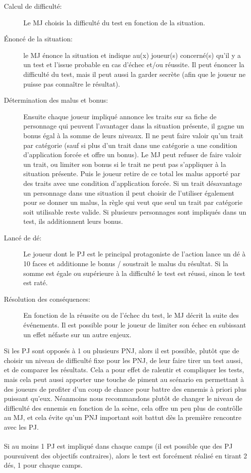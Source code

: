 \documentclass[a4paper,10pt,twoside,twocolumn]{article}
\begin{document}
 \begin{description}
  \item[Calcul de difficulté:] Le MJ choisis la difficulté du test en fonction de la situation.
  \item[Énoncé de la situation:] le MJ énonce la situation et indique au(x) joueur(s) concerné(s) qu'il y a un test et l'issue probable en cas d'échec et/ou réussite. Il peut énoncer la difficulté du test, mais il peut aussi la garder secrète (afin que le joueur ne puisse pas connaître le résultat).
  \item[Détermination des malus et bonus:] Ensuite chaque joueur impliqué annonce les traits sur sa fiche de personnage qui peuvent l'avantager dans la situation présente, il gagne un bonus égal à la somme de leurs niveaux. Il ne peut faire valoir qu'un trait par catégorie (sauf si plus d'un trait dans une catégorie a une condition d'application forcée et offre un bonus). Le MJ peut refuser de faire valoir un trait, ou limiter son bonus si le trait ne peut pas s'appliquer à la situation présente. Puis le joueur retire de ce total les malus apporté par des traits avec une condition d'application forcée. Si un trait désavantage un personnage dans une situation il peut choisir de l'utiliser également pour se donner un malus, la règle qui veut que seul un trait par catégorie soit utilisable reste valide. Si plusieurs personnages sont impliqués dans un test, ils additionnent leurs bonus.
  \item[Lancé de dé:] Le joueur dont le PJ est le principal protagoniste de l'action lance un dé à 10 faces et additionne le bonus / soustrait le malus du résultat. Si la somme est égale ou supérieure à la difficulté le test est réussi, sinon le test est raté.
  \item[Résolution des conséquences:] En fonction de la réussite ou de l'échec du test, le MJ décrit la suite des événements. Il est possible pour le joueur de limiter son échec en subissant un effet néfaste sur un autre enjeux.
 \end{description}
 
 Si les PJ sont opposés à 1 ou plusieurs PNJ, alors il est possible, plutôt que de choisir un niveau de difficulté fixe pour les PNJ, de leur faire tirer un test aussi, et de comparer les résultats. Cela a pour effet de ralentir et compliquer les tests, mais cela peut aussi apporter une touche de piment au scénario en permettant à des joueurs de profiter d'un coup de chance pour battre des ennemis à priori plus puissant qu'eux. Néanmoins nous recommandons plutôt de changer le niveau de difficulté des ennemis en fonction de la scène, cela offre un peu plus de contrôlle au MJ, et cela évite qu'un PNJ important soit battut dès la première rencontre avec les PJ.\\
 \\
 Si au moins 1 PJ est impliqué dans chaque camps (il est possible que des PJ poursuivent des objectifs contraires), alors le test est forcément réalisé en tirant 2 dés, 1 pour chaque camps.
\end{document}

